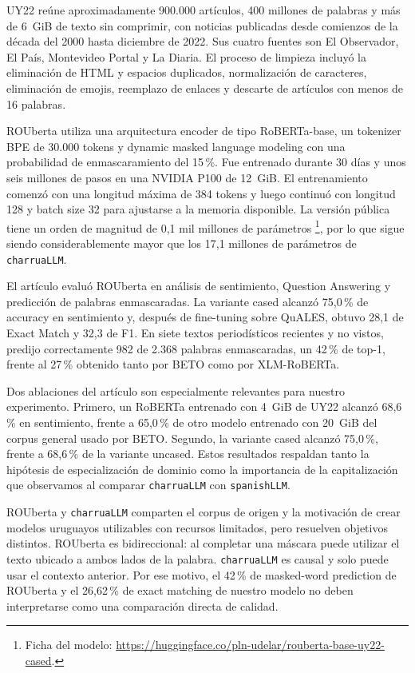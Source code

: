 \documentclass[11pt,a4paper]{article}
\newcommand{\charrua}{\texttt{charruaLLM}}
\newcommand{\spanishmodel}{\texttt{spanishLLM}}
\begin{document}
UY22 reúne aproximadamente 900.000 artículos, 400 millones de palabras y más
de 6~GiB de texto sin comprimir, con noticias publicadas desde comienzos de la
década del 2000 hasta diciembre de 2022. Sus cuatro fuentes son El Observador,
El País, Montevideo Portal y La Diaria. El proceso de limpieza incluyó la
eliminación de HTML y espacios duplicados, normalización de caracteres,
eliminación de emojis, reemplazo de enlaces y descarte de artículos con menos
de 16 palabras.

ROUberta utiliza una arquitectura encoder de tipo RoBERTa-base, un tokenizer
BPE de 30.000 tokens y dynamic masked language modeling con una probabilidad de
enmascaramiento del 15\,\%. Fue entrenado durante 30 días y unos seis millones
de pasos en una NVIDIA P100 de 12~GiB. El entrenamiento comenzó con una
longitud máxima de 384 tokens y luego continuó con longitud 128 y batch size 32
para ajustarse a la memoria disponible. La versión pública tiene un orden de
magnitud de 0,1 mil millones de parámetros
\footnote{Ficha del modelo: \url{https://huggingface.co/pln-udelar/rouberta-base-uy22-cased}.},
por lo que sigue siendo considerablemente mayor que los 17,1 millones de
parámetros de \charrua.

El artículo evaluó ROUberta en análisis de sentimiento, Question Answering y
predicción de palabras enmascaradas. La variante cased alcanzó 75,0\,\% de
accuracy en sentimiento y, después de fine-tuning sobre QuALES, obtuvo 28,1 de
Exact Match y 32,3 de F1. En siete textos periodísticos recientes y no vistos,
predijo correctamente 982 de 2.368 palabras enmascaradas, un 42\,\% de top-1,
frente al 27\,\% obtenido tanto por BETO como por XLM-RoBERTa.

Dos ablaciones del artículo son especialmente relevantes para nuestro
experimento. Primero, un RoBERTa entrenado con 4~GiB de UY22 alcanzó 68,6\,\%
en sentimiento, frente a 65,0\,\% de otro modelo entrenado con 20~GiB del corpus
general usado por BETO. Segundo, la variante cased alcanzó 75,0\,\%, frente a
68,6\,\% de la variante uncased. Estos resultados respaldan tanto la hipótesis
de especialización de dominio como la importancia de la capitalización que
observamos al comparar \charrua{} con \spanishmodel.

ROUberta y \charrua{} comparten el corpus de origen y la motivación de crear
modelos uruguayos utilizables con recursos limitados, pero resuelven objetivos
distintos. ROUberta es bidireccional: al completar una máscara puede utilizar
el texto ubicado a ambos lados de la palabra. \charrua{} es causal y solo puede
usar el contexto anterior. Por ese motivo, el 42\,\% de masked-word prediction
de ROUberta y el 26,62\,\% de exact matching de nuestro modelo no deben
interpretarse como una comparación directa de calidad.
\end{document}
